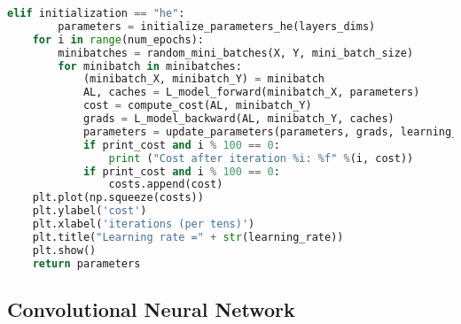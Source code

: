 \begin{lstlisting}[language=Python]
    elif initialization == "he":
        parameters = initialize_parameters_he(layers_dims)
    for i in range(num_epochs):
        minibatches = random_mini_batches(X, Y, mini_batch_size)
        for minibatch in minibatches:
            (minibatch_X, minibatch_Y) = minibatch
            AL, caches = L_model_forward(minibatch_X, parameters)
            cost = compute_cost(AL, minibatch_Y)
            grads = L_model_backward(AL, minibatch_Y, caches)
            parameters = update_parameters(parameters, grads, learning_rate)
            if print_cost and i % 100 == 0:
                print ("Cost after iteration %i: %f" %(i, cost))
            if print_cost and i % 100 == 0:
                costs.append(cost)
    plt.plot(np.squeeze(costs))
    plt.ylabel('cost')
    plt.xlabel('iterations (per tens)')
    plt.title("Learning rate =" + str(learning_rate))
    plt.show()
    return parameters
\end{lstlisting}

\subsection{Convolutional Neural Network}

